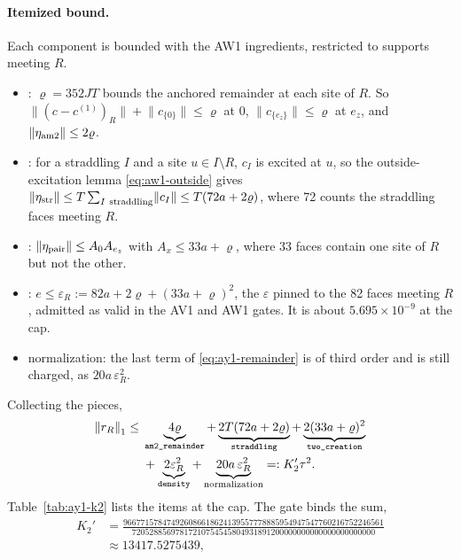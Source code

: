 \paragraph{Itemized bound.}
Each component is bounded with the AW1 ingredients, restricted to supports
meeting $R$.
\begin{itemize}
\item {}: $\varrho=352JT$ bounds the anchored remainder
 at each site of $R$. So
 $\lVert (c-c^{(1)})_R\rVert +\lVert c_{\{0\}}\rVert \le\varrho$ at $0$,
 $\lVert c_{\{e_z\}}\rVert \le\varrho$ at $e_z$, and
 $\lVert \eta_{\rm am2}\rVert \le2\varrho$.
\item {}: for a straddling $I$ and a site $u\in I\setminus R$,
 $c_I$ is excited at $u$, so the outside-excitation lemma
 \eqref{eq:aw1-outside} gives
 $\lVert \eta_{\rm str}\rVert \le T\sum_{I\ \rm straddling}\lVert c_I\rVert \le
 T(72a+2\varrho)$, where 72 counts the straddling faces meeting $R$.
\item {}: $\lVert \eta_{\rm pair}\rVert \le A_0A_{e_z}$ with
 $A_x\le33a+\varrho$, where 33 faces contain one site of $R$ but not the
 other.
\item {}: $e\le\varepsilon_R:=82a+2\varrho+(33a+\varrho)^2$,
 the $\varepsilon$ pinned to the 82 faces meeting $R$, admitted as valid in
 the AV1 and AW1 gates. It is about $5.695\times10^{-9}$ at the cap.
\item normalization: the last term of \eqref{eq:ay1-remainder} is of third
 order and is still charged, as $20a\,\varepsilon_R^2$.
\end{itemize}
Collecting the pieces,
\begin{equation}
 \begin{aligned}
 \norm{r_R}_1\le{}&
 \underbrace{4\varrho}_{\recid{am2_remainder}}
 +\underbrace{2T(72a+2\varrho)}_{\recid{straddling}}
 +\underbrace{2(33a+\varrho)^2}_{\recid{two_creation}}\\
 &+\underbrace{2\varepsilon_R^2}_{\recid{density}}
 +\underbrace{20a\,\varepsilon_R^2}_{\text{normalization}}
 =:K_2'\tau^2 .
 \end{aligned}
 \label{eq:ay1-k2}
\end{equation}
Table~\ref{tab:ay1-k2} lists the items at the cap. The gate binds the sum,
\begin{equation}
 \begin{aligned}
 K_2'&=\frac{966771578474926086618624139557778885954947547760216752246561}{72052885697817210754545804931891200000000000000000000000}\\
 &\approx13417.5275439,
 \end{aligned}
 \label{eq:ay1-K2}
\end{equation}
